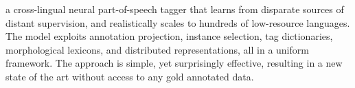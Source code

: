 a cross-lingual neural part-of-speech tagger that learns from disparate sources of distant supervision, and realistically scales to hundreds of low-resource languages. The model exploits annotation projection, instance selection, tag dictionaries, morphological lexicons, and distributed representations, all in a uniform framework. The approach is simple, yet surprisingly effective, resulting in a new state of the art without access to any gold annotated data.
